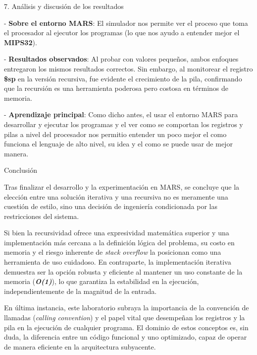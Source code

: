 \documentclass[
]{article}
\begin{document}
7. Análisis y discusión de los resultados

- \textbf{Sobre el entorno MARS}: El simulador nos permite ver el
proceso que toma el procesador al ejecutor los programas (lo que nos
ayudo a entender mejor el \textbf{MIPS32}).

- \textbf{Resultados observados}: Al probar con valores pequeños, ambos
enfoques entregaron los mismos resultados correctos. Sin embargo, al
monitorear el registro \textbf{\$sp} en la versión recursiva, fue
evidente el crecimiento de la pila, confirmando que la recursión es una
herramienta poderosa pero costosa en términos de memoria.

- \textbf{Aprendizaje principal}: Como dicho antes, el usar el entorno
MARS para desarrollar y ejecutar los programas y el ver como se
comportan los registros y pilas a nivel del procesador nos permitio
entender un poco mejor el como funciona el lenguaje de alto nivel, su
idea y el como se puede usar de mejor manera.

Conclusión

Tras finalizar el desarrollo y la experimentación en MARS, se concluye
que la elección entre una solución iterativa y una recursiva no es
meramente una cuestión de estilo, sino una decisión de ingeniería
condicionada por las restricciones del sistema.

Si bien la recursividad ofrece una expresividad matemática superior y
una implementación más cercana a la definición lógica del problema, su
costo en memoria y el riesgo inherente de \emph{stack overflow} la
posicionan como una herramienta de uso cuidadoso. En contraparte, la
implementación iterativa demuestra ser la opción robusta y eficiente al
mantener un uso constante de la memoria (\emph{\textbf{O(1)}}), lo que
garantiza la estabilidad en la ejecución, independientemente de la
magnitud de la entrada.

En última instancia, este laboratorio subraya la importancia de la
convención de llamadas (\emph{calling convention}) y el papel vital que
desempeñan los registros y la pila en la ejecución de cualquier
programa. El dominio de estos conceptos es, sin duda, la diferencia
entre un código funcional y uno optimizado, capaz de operar de manera
eficiente en la arquitectura subyacente.
\end{document}
